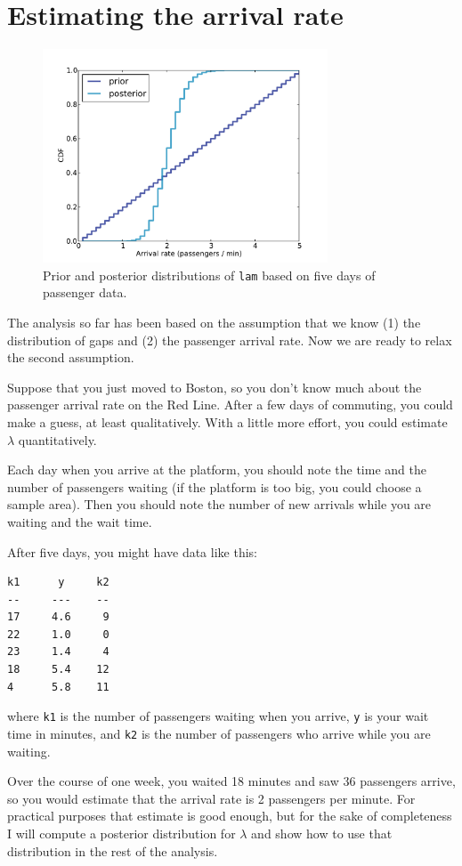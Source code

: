 \documentclass[12pt]{book}
\begin{document}
\section{Estimating the arrival rate}

\begin{figure}
\centerline{\includegraphics[height=2.5in]{figs/redline1.pdf}}
\caption{Prior and posterior distributions of {\tt lam} based
on five days of passenger data. }
\label{fig.redline1}
\end{figure}

The analysis so far has been based on the assumption that we know (1)
the distribution of gaps and (2) the passenger arrival rate.  Now we
are ready to relax the second assumption.

Suppose that you just moved to Boston, so you don't know much about
the passenger arrival rate on the Red Line.  After a few days of
commuting, you could make a guess, at least qualitatively.  With
a little more effort, you could estimate $\lambda$ quantitatively.

Each day when you arrive at the platform, you should note the
time and the number of passengers waiting (if the platform is too
big, you could choose a sample area).  Then you should note the
number of new arrivals while you are waiting and the wait time.

After five days, you might have data like this:
%
\begin{verbatim}
k1      y     k2
--     ---    --
17     4.6     9
22     1.0     0
23     1.4     4
18     5.4    12
4      5.8    11
\end{verbatim}
%
where {\tt k1} is the number of passengers waiting when you arrive,
{\tt y} is your wait time in minutes, and {\tt k2} is the number of
passengers who arrive while you are waiting.

Over the course of one week, you waited 18 minutes and saw 36
passengers arrive, so you would estimate that the arrival rate is
2 passengers per minute.  For practical purposes that estimate is
good enough, but for the sake of completeness I
will compute a posterior distribution for $\lambda$ and show how
to use that distribution in the rest of the analysis.
\end{document}
